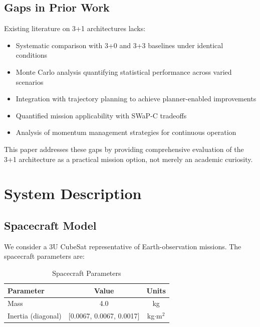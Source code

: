\documentclass[9pt]{extarticle}
\begin{document}

\subsection{Gaps in Prior Work}

Existing literature on 3+1 architectures lacks:

\begin{itemize}
    \item Systematic comparison with 3+0 and 3+3 baselines under identical conditions
    \item Monte Carlo analysis quantifying statistical performance across varied scenarios
    \item Integration with trajectory planning to achieve planner-enabled improvements
    \item Quantified mission applicability with SWaP-C tradeoffs
    \item Analysis of momentum management strategies for continuous operation
\end{itemize}

This paper addresses these gaps by providing comprehensive evaluation of the 3+1 architecture as a practical mission option, not merely an academic curiosity.


\section{System Description}\label{sec:system}

\subsection{Spacecraft Model}

We consider a 3U CubeSat representative of Earth-observation missions. The spacecraft parameters are:

\begin{table}[h]
    \centering
    \caption{Spacecraft Parameters}
    \label{tab:spacecraft_params}
    \begin{tabular}{lcc}
        \toprule
        Parameter & Value & Units \\
        \midrule
        Mass & 4.0 & kg \\
        Inertia (diagonal) & [0.0067, 0.0067, 0.0017] & kg$\cdot$m$^2$ \\
        \bottomrule
    \end{tabular}
\end{table}
\end{document}

